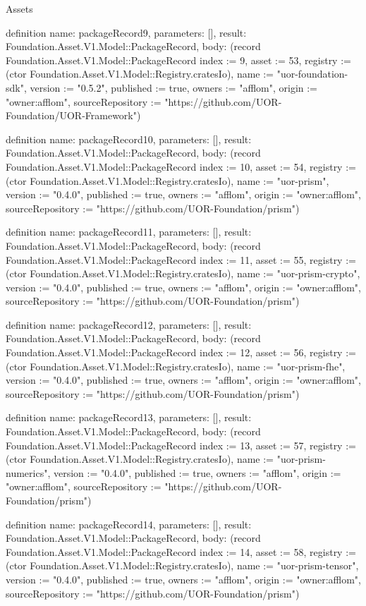 \begin{lexlean}{Assets}
\begin{semanticmodule}
definition{
  name: packageRecord9,
  parameters: [],
  result: Foundation.Asset.V1.Model::PackageRecord,
  body: (record Foundation.Asset.V1.Model::PackageRecord {index := 9, asset := 53, registry := (ctor Foundation.Asset.V1.Model::Registry.cratesIo), name := "uor-foundation-sdk", version := "0.5.2", published := true, owners := "afflom", origin := "owner:afflom", sourceRepository := "https://github.com/UOR-Foundation/UOR-Framework"})
}

definition{
  name: packageRecord10,
  parameters: [],
  result: Foundation.Asset.V1.Model::PackageRecord,
  body: (record Foundation.Asset.V1.Model::PackageRecord {index := 10, asset := 54, registry := (ctor Foundation.Asset.V1.Model::Registry.cratesIo), name := "uor-prism", version := "0.4.0", published := true, owners := "afflom", origin := "owner:afflom", sourceRepository := "https://github.com/UOR-Foundation/prism"})
}

definition{
  name: packageRecord11,
  parameters: [],
  result: Foundation.Asset.V1.Model::PackageRecord,
  body: (record Foundation.Asset.V1.Model::PackageRecord {index := 11, asset := 55, registry := (ctor Foundation.Asset.V1.Model::Registry.cratesIo), name := "uor-prism-crypto", version := "0.4.0", published := true, owners := "afflom", origin := "owner:afflom", sourceRepository := "https://github.com/UOR-Foundation/prism"})
}

definition{
  name: packageRecord12,
  parameters: [],
  result: Foundation.Asset.V1.Model::PackageRecord,
  body: (record Foundation.Asset.V1.Model::PackageRecord {index := 12, asset := 56, registry := (ctor Foundation.Asset.V1.Model::Registry.cratesIo), name := "uor-prism-fhe", version := "0.4.0", published := true, owners := "afflom", origin := "owner:afflom", sourceRepository := "https://github.com/UOR-Foundation/prism"})
}

definition{
  name: packageRecord13,
  parameters: [],
  result: Foundation.Asset.V1.Model::PackageRecord,
  body: (record Foundation.Asset.V1.Model::PackageRecord {index := 13, asset := 57, registry := (ctor Foundation.Asset.V1.Model::Registry.cratesIo), name := "uor-prism-numerics", version := "0.4.0", published := true, owners := "afflom", origin := "owner:afflom", sourceRepository := "https://github.com/UOR-Foundation/prism"})
}

definition{
  name: packageRecord14,
  parameters: [],
  result: Foundation.Asset.V1.Model::PackageRecord,
  body: (record Foundation.Asset.V1.Model::PackageRecord {index := 14, asset := 58, registry := (ctor Foundation.Asset.V1.Model::Registry.cratesIo), name := "uor-prism-tensor", version := "0.4.0", published := true, owners := "afflom", origin := "owner:afflom", sourceRepository := "https://github.com/UOR-Foundation/prism"})
}


\end{semanticmodule}
\end{lexlean}
